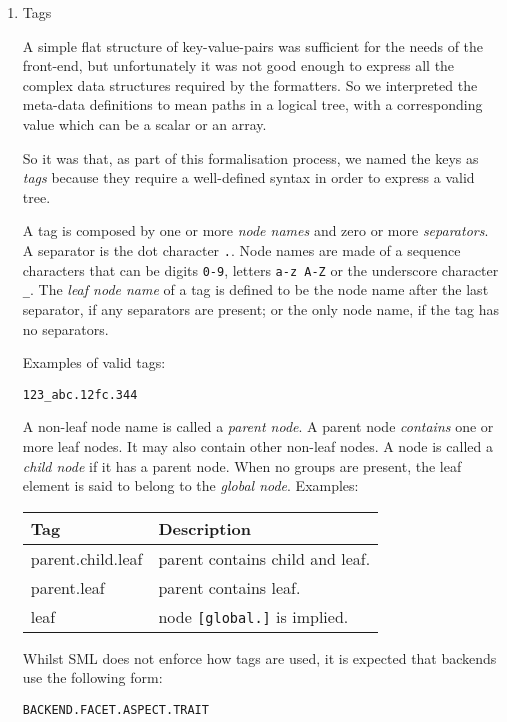\documentclass[11pt]{article}
\begin{document}
\begin{enumerate}
\begin{enumerate}
\begin{enumerate}
\item Tags
\label{sec-2-2-1-2-4-2}

A simple flat structure of key-value-pairs was sufficient for the
needs of the front-end, but unfortunately it was not good enough to
express all the complex data structures required by the formatters. So
we interpreted the meta-data definitions to mean paths in a logical
tree, with a corresponding value which can be a scalar or an array.

So it was that, as part of this formalisation process, we named the
keys as \emph{tags} because they require a well-defined syntax in order to
express a valid tree.

A tag is composed by one or more \emph{node names} and zero or more
\emph{separators}. A separator is the dot character \texttt{.}. Node names are
made of a sequence characters that can be digits \texttt{0-9}, letters \texttt{a-z
A-Z} or the underscore character \texttt{\_}. The \emph{leaf node name} of a tag is
defined to be the node name after the last separator, if any
separators are present; or the only node name, if the tag has no
separators.

Examples of valid tags:

\begin{verbatim}
123_abc.12fc.344
\end{verbatim}

A non-leaf node name is called a \emph{parent node}. A parent node
\emph{contains} one or more leaf nodes. It may also contain other non-leaf
nodes. A node is called a \emph{child node} if it has a parent node. When
no groups are present, the leaf element is said to belong to the
\emph{global node}. Examples:

\begin{center}
\begin{tabular}{ll}
Tag & Description\\
\hline
parent.child.leaf & parent contains child and leaf.\\
parent.leaf & parent contains leaf.\\
leaf & node \texttt{[global.]} is implied.\\
\end{tabular}
\end{center}

Whilst SML does not enforce how tags are used, it is expected that
backends use the following form:

\begin{verbatim}
BACKEND.FACET.ASPECT.TRAIT
\end{verbatim}


\end{enumerate}
\end{enumerate}
\end{enumerate}
\end{document}
